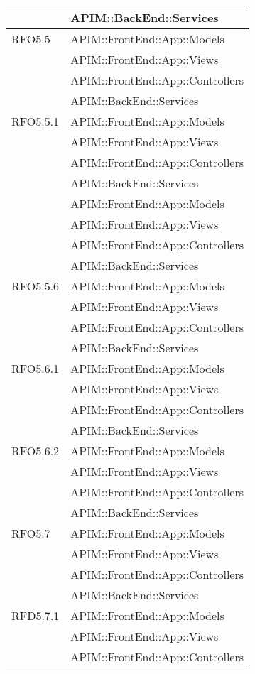\begin{longtable}{ p{4cm} | p{12cm} }
			& APIM::BackEnd::Services \\
			\hline		
			RFO5.5
			& APIM::FrontEnd::App::Models \\
			& APIM::FrontEnd::App::Views \\
			& APIM::FrontEnd::App::Controllers \\
			& APIM::BackEnd::Services \\
			\hline		
			RFO5.5.1
			& APIM::FrontEnd::App::Models \\
			& APIM::FrontEnd::App::Views \\
			& APIM::FrontEnd::App::Controllers \\
			& APIM::BackEnd::Services \\
			\hline		
			& APIM::FrontEnd::App::Models \\
			& APIM::FrontEnd::App::Views \\
			& APIM::FrontEnd::App::Controllers \\
			& APIM::BackEnd::Services \\
			\hline		
			RFO5.5.6
			& APIM::FrontEnd::App::Models \\
			& APIM::FrontEnd::App::Views \\
			& APIM::FrontEnd::App::Controllers \\
			& APIM::BackEnd::Services \\
			\hline		
			RFO5.6.1
			& APIM::FrontEnd::App::Models \\
			& APIM::FrontEnd::App::Views \\
			& APIM::FrontEnd::App::Controllers \\
			& APIM::BackEnd::Services \\
			\hline	
			RFO5.6.2
			& APIM::FrontEnd::App::Models \\
			& APIM::FrontEnd::App::Views \\
			& APIM::FrontEnd::App::Controllers \\
			& APIM::BackEnd::Services \\
			\hline	
			RFO5.7
			& APIM::FrontEnd::App::Models \\
			& APIM::FrontEnd::App::Views \\
			& APIM::FrontEnd::App::Controllers \\
			& APIM::BackEnd::Services \\
			\hline		
			RFD5.7.1
			& APIM::FrontEnd::App::Models \\
			& APIM::FrontEnd::App::Views \\
			& APIM::FrontEnd::App::Controllers \\

\end{longtable}
